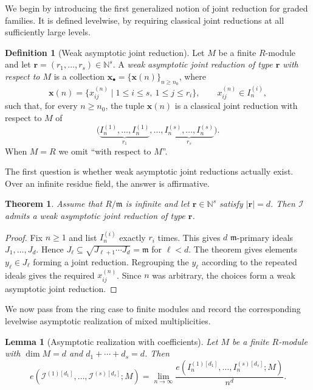 \documentclass[reqno,12pt]{amsart}
\theoremstyle{plain}
\newtheorem{thm}[prop]{Theorem}
\newtheorem{lem}[prop]{Lemma}
\theoremstyle{definition}
\newtheorem{defn}[prop]{Definition}
\theoremstyle{remark}
\newcommand{\N}{\mathbb N}
\numberwithin{equation}{section}
\begin{document}
We begin by introducing the first generalized notion of joint reduction
for graded families. It is defined levelwise, by requiring classical
joint reductions at all sufficiently large levels.

\begin{defn}[Weak asymptotic joint reduction]
\label{def:weak}
Let $M$ be a finite $R$-module and let
$\mathbf r=(r_1,\ldots,r_s)\in\N^s$. A
\emph{weak asymptotic joint reduction of type $\mathbf r$ with respect
to $M$} is a collection
$\mathbf x_\bullet=\{\mathbf x(n)\}_{n\geq n_0}$, where
\[
\mathbf x(n)=
\{x_{ij}^{(n)}\mid 1\leq i\leq s,\ 1\leq j\leq r_i\},
\qquad
x_{ij}^{(n)}\in I_n^{(i)},
\]
such that, for every $n\geq n_0$, the tuple $\mathbf x(n)$ is a
classical joint reduction with respect to $M$ of
\[
\bigl(
\underbrace{I_n^{(1)},\ldots,I_n^{(1)}}_{r_1},
\ldots,
\underbrace{I_n^{(s)},\ldots,I_n^{(s)}}_{r_s}
\bigr).
\]
When $M=R$ we omit ``with respect to $M$''.
\end{defn}

The first question is whether weak asymptotic joint reductions actually
exist. Over an infinite residue field, the answer is affirmative.

\begin{thm}
\label{thm:weak-existence}
Assume that $R/\mathfrak m$ is infinite and let
$\mathbf r\in\N^s$ satisfy $|\mathbf r|=d$. Then
$\boldsymbol{\mathcal I}$ admits a weak asymptotic joint reduction of
type $\mathbf r$. 
\end{thm}

\begin{proof}
Fix $n\geq1$ and list $I_n^{(i)}$ exactly $r_i$ times. This gives $d$
$\mathfrak m$-primary ideals $J_1,\ldots,J_d$. Hence
$J_\ell\subseteq\sqrt{J_{\ell+1}\cdots J_d}=\mathfrak m$ for
$\ell<d$. The theorem
\cite[Theorem~17.3.1]{SwansonHuneke} gives elements
$y_\ell\in J_\ell$ forming a joint reduction. Regrouping the $y_\ell$
according to the repeated ideals gives the required
$x_{ij}^{(n)}$. Since $n$ was arbitrary, the choices form a weak
asymptotic joint reduction.
\end{proof}

We now pass from the ring case to finite modules and record the
corresponding levelwise asymptotic realization of mixed multiplicities.

\begin{lem}[Asymptotic realization with coefficients]
\label{lem:module-level-limit}
Let $M$ be a finite $R$-module with $\dim M=d$ and
$d_1+\cdots+d_s=d$. Then
\[
e\!\left(\mathcal I^{(1)[d_1]},\ldots,
\mathcal I^{(s)[d_s]};M\right)
=
\lim_{n\to\infty}
\frac{
e(I_n^{(1)[d_1]},\ldots,I_n^{(s)[d_s]};M)
}{n^d}.
\]
\end{lem}
\end{document}
